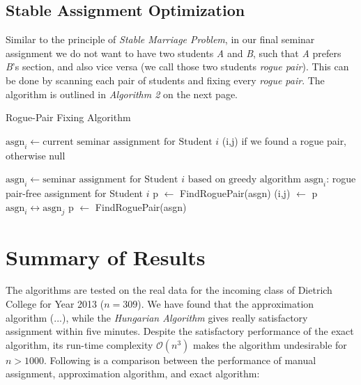 \documentclass{article} %
\begin{document}
\subsection{Stable Assignment Optimization}
    \par Similar to the principle of \emph{Stable Marriage Problem}, in our final seminar assignment we do not want to have two students \emph{A} and \emph{B}, such that \emph{A} prefers \emph{B}'s section, and also vice versa (we call those two students \emph{rogue pair}). This can be done by scanning each pair of students and fixing every \emph{rogue pair}. The algorithm is outlined in \emph{Algorithm 2} on the next page.
    \begin{algorithm}
        \caption{Rogue-Pair Fixing Algorithm}
        \begin{algorithmic}
        \Require $\text{asgn}_i \gets \text{current seminar assignment for Student $i$}$
        \Ensure (i,j) if we found a rogue pair, otherwise null
                    \EndIf
                \EndFor
            \EndFor
        \EndFunction
        
        \null
        
        \Require $\text{asgn}_i \gets \text{seminar assignment for Student $i$ based on greedy algorithm}$
        \Ensure $\text{asgn}_i$: rogue pair-free assignment for Student $i$
                \State p $\gets$ FindRoguePair(asgn)
                    \State (i,j) $\gets$ p
                    \State $\text{asgn}_i \leftrightarrow \text{asgn}_j$
                    \State p $\gets$ FindRoguePair(asgn)
                \EndWhile
        
        \end{algorithmic}
    \end{algorithm}

%
%
\section{Summary of Results}
    \par\qquad The algorithms are tested on the real data for the incoming class of Dietrich College for Year 2013 ($n=309$). We have found that the approximation algorithm (...), while the \emph{Hungarian Algorithm} gives really satisfactory assignment within five minutes. Despite the satisfactory performance of the exact algorithm, its run-time complexity $\mathcal{O}(n^3)$ makes the algorithm undesirable for $n>1000$. Following is a comparison between the performance of manual assignment, approximation algorithm, and exact algorithm:
\end{document}
